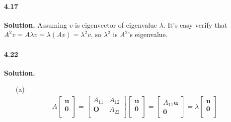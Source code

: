 \documentclass[a4paper]{book}
\newenvironment{solution}%
{\noindent\textbf{Solution.}}%
{\qedhere}
\numberwithin{equation}{chapter}
\theoremstyle{definition}
\begin{document}
\paragraph*{4.17 }
\begin{solution}
    Assuming $v$ is eigenvector of eigenvalue $\lambda$. It's 
    easy verify that $A^2 v = A \lambda v = \lambda (Av) = 
    \lambda^2 v$, so $\lambda^2$ is $A^2$'s eigenvalue.
\end{solution}

\paragraph*{4.22 }
\begin{solution}
    \begin{itemize}
        \item [(a)] \begin{align*}
            A \left[\begin{array}{c}
                \bm u \\
                \bm 0 \\
            \end{array}\right] =
            \left[\begin{array}{cc}
                A_{11} & A_{12} \\
                \bm O      & A_{22} \\
            \end{array}\right] 
            \left[\begin{array}{c}
                \bm u \\
                \bm 0 \\    
            \end{array}\right] =
            \left[\begin{array}{c}
                A_{11} \bm u \\
                \bm 0   
            \end{array}\right] = 
             \lambda \left[\begin{array}{c}
                \bm u \\
                \bm 0 \\
            \end{array}\right]
        \end{align*}
        

\end{itemize}
\end{solution}
\end{document}
